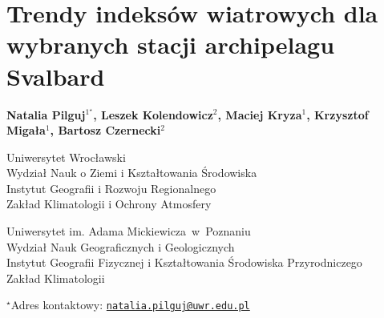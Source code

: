 \documentclass[\main/boa.tex]{subfiles}
\begin{document}
\section{Trendy indeksów wiatrowych dla wybranych stacji archipelagu Svalbard}

\begin{center}
  {\bf {} Natalia Pilguj$^{1^\star}$,  Leszek Kolendowicz$^{2}$,  Maciej Kryza$^{1}$,  Krzysztof Migała$^{1}$,  Bartosz Czernecki$^{2}$}
\end{center}

\vskip 0.3cm

\begin{affiliations}
\begin{enumerate}
\begin{minipage}{0.915\textwidth}
\centering
\item Uniwersytet Wrocławski\\ Wydział Nauk o Ziemi i Kształtowania Środowiska\\Instytut Geografii i Rozwoju Regionalnego\\Zakład Klimatologii i Ochrony Atmosfery\\[-2pt]
\item Uniwersytet im. Adama Mickiewicza~w~Poznaniu \\ Wydział Nauk Geograficznych i Geologicznych  \\ Instytut Geografii Fizycznej i Kształtowania Środowiska Przyrodniczego\\
Zakład Klimatologii \\[-2pt]
\end{minipage}
\end{enumerate}
$^\star$Adres kontaktowy: \href{mailto:natalia.pilguj@uwr.edu.pl}{\nolinkurl{natalia.pilguj@uwr.edu.pl}}\\
\end{affiliations}

\vskip 0.5cm


\vskip 0.5cm
\end{document}
